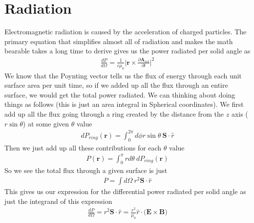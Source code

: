 \section{Radiation}
Electromagnetic radiation is caused by the acceleration of charged particles. The primary equation that simplifies almost all of radiation and makes the math bearable takes a long time to derive \cite{zangwill} gives us the power radiated per solid angle as %
\begin{align}\label{powerdistribution}
    \frac{dP}{d\Omega} = \frac{1}{c\mu_0}\Big| \textbf{r}\times\frac{\partial \textbf{A}_{ret}}{\partial t}\Big|^2
\end{align}
We know that the Poynting vector tells us the flux of energy through each unit surface area per unit time, so if we added up all the flux through an entire surface, we would get the total power radiated. We can thinking about doing things as follows (this is just an area integral in Spherical coordinates). We first add up all the flux going through a ring created by the distance from the $z$ axis ($r\sin\theta$) at some given $\theta$ value
\begin{align}
    dP_{ring} (\textbf{r}) = \int_0^{2\pi} d\phi r\sin\theta ~\textbf{S}\cdot\hat{r}
\end{align}
Then we just add up all these contributions for each $\theta$ value
\begin{align}
    P (\textbf{r}) = \int_0^\pi r d\theta~ dP_{ring} (\textbf{r})
\end{align}
So we see the total flux through a given surface is just 
\begin{align}
    P = \int d\Omega  ~r^2 \textbf{S}\cdot{\hat{r}}
\end{align}
This gives us our expression for the differential power radiated per solid angle as just the integrand of this expression 
\begin{align}
    \frac{dP}{d\Omega} = r^2\textbf{S}\cdot\hat{r} = \frac{r^2}{\mu_0} \hat{r}\cdot\Big(\textbf{E}\times\textbf{B}\Big)
\end{align}



